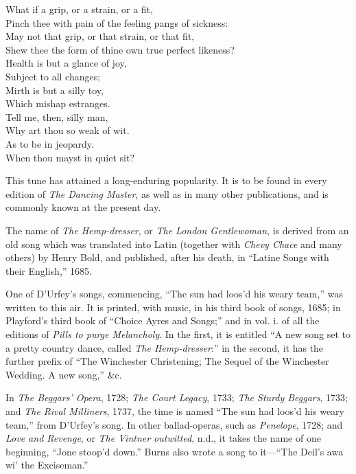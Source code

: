 \begin{dcverse}
\begin{patverse}
What if a grip, or a strain, or a fit,\\
Pinch thee with pain of the feeling pangs of sickness:\\
May not that grip, or that strain, or that fit,\\
Shew thee the form of thine own true perfect likeness?\\
Health is but a glance of joy,\\
Subject to all changes;\\
Mirth is but a silly toy,\\
Which mishap estranges.\\
Tell me, then, silly man,\\
Why art thou so weak of wit.\\
As to be in jeopardy.\\
When thou mayst in quiet sit?
\end{patverse}
\end{dcverse}


This tune has attained a long-enduring popularity. It is to be found in every
edition of \textit{The Dancing Master}, as well as in many other publications, and is
commonly known at the present day.

The name of \textit{The Hemp-dresser}, or \textit{The London Gentlewoman}, is derived from
an old song which was translated into Latin (together with \textit{Chevy Chace} and many
others) by Henry Bold, and published, after his death, in “Latine Songs with
their English,” 1685.

One of D’Urfey’s songs, commencing, “The sun had loos’d his weary team,”
was written to this air. It is printed, with music, in his third book of songs,
1685; in Playford’s third book of “Choice Ayres and Songs;” and in vol. i.
of all the editions of \textit{Pills to purge Melancholy}. In the first, it is entitled “A new
song set to a pretty country dance, called \textit{The Hemp-dresser}:” in the second, it
has the further prefix of “The Winchester Christening; The Sequel of the
Winchester Wedding. A new song,” \&c.

In \textit{The Beggars’ Opera}, 1728; \textit{The Court Legacy}, 1733; \textit{The Sturdy Beggars},
1733; and \textit{The Rival Milliners}, 1737, the time is named “The sun had loos’d
his weary team,” from D’Urfey’s song. In other ballad-operas, such as \textit{Penelope},
1728; and \textit{Love and Revenge}, or \textit{The Vintner outwitted}, n.d., it takes the name
of one beginning, “Jone stoop’d down.” Burns also wrote a song to it—“The
Deil’s awa wi’ the Exciseman.”
\pagebreak

